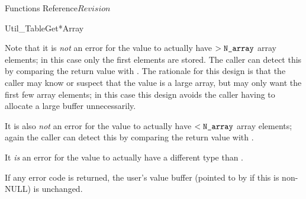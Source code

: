 \begin{cactuspart}{ Functions Reference}{}{$Revision$}
\begin{FunctionDescription}{Util\_TableGet*Array}
\begin{Discussion}
Note that it is {\em not\/} an error for the value to actually have
$> \texttt{N\_array}$ array elements; in this case only the first 
elements are stored.  The caller can detect this by comparing the
return value with .
The rationale for this design is that the caller may know or suspect
that the value is a large array, but may only want the first few array
elements; in this case this design avoids the caller having to allocate
a large buffer unnecessarily.

It is also {\em not\/} an error for the value to actually have
$< \texttt{N\_array}$ array elements; again the caller can detect this by
comparing the return value with .

It {\em is\/} an error for the value to actually have a different type
than .

If any error code is returned, the user's value buffer
(pointed to by  if this is non-NULL) is unchanged.
\end{Discussion}


\end{FunctionDescription}
\end{cactuspart}
